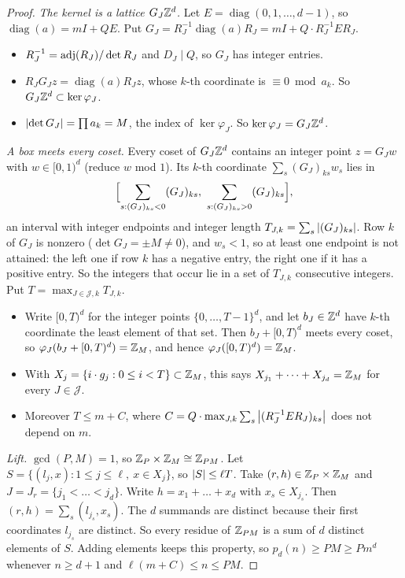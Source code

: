 \documentclass[11pt]{article}
\begin{document}
\begin{proof}
\emph{The kernel is a lattice $G_J \mathbb{Z}^d$.} Let $E = \operatorname{diag}(0, 1, \dots, d-1)$, so
$\operatorname{diag}(a) = mI + QE$. Put
$G_J = R_J^{-1} \operatorname{diag}(a) R_J = mI + Q \cdot R_J^{-1} E R_J$.
\begin{itemize}
  \item $R_J^{-1} = \operatorname{adj}(R_J)/\det R_J$ and $D_J \mid Q$, so $G_J$ has integer entries.
  \item $R_J G_J z = \operatorname{diag}(a) R_J z$, whose $k$-th coordinate is $\equiv 0 \bmod a_k$.
    So $G_J \mathbb{Z}^d \subset \ker \varphi_J$.
  \item $\left|\det G_J\right| = \prod a_k = M$, the index of $\ker \varphi_J$. So
    $\ker \varphi_J = G_J \mathbb{Z}^d$.
\end{itemize}

\emph{A box meets every coset.} Every coset of $G_J \mathbb{Z}^d$ contains an integer point $z = G_J w$
with $w \in [0,1)^d$ (reduce $w$ mod $1$). Its $k$-th coordinate $\sum_s (G_J)_{ks} w_s$ lies in
\[
  \Bigl[\sum_{s : (G_J)_{ks} < 0} (G_J)_{ks},\ \sum_{s : (G_J)_{ks} > 0} (G_J)_{ks}\Bigr],
\]
an interval with integer endpoints and integer length $T_{J,k} = \sum_s \left|(G_J)_{ks}\right|$. Row $k$
of $G_J$ is nonzero ($\det G_J = \pm M \ne 0$), and $w_s < 1$, so at least one endpoint is not
attained: the left one if row $k$ has a negative entry, the right one if it has a positive entry.
So the integers that occur lie in a set of $T_{J,k}$ consecutive integers. Put
$T = \max_{J \in \mathcal{J}, k} T_{J,k}$.
\begin{itemize}
  \item Write $[0, T)^d$ for the integer points $\{0, \dots, T-1\}^d$, and let $b_J \in \mathbb{Z}^d$ have
    $k$-th coordinate the least element of that set. Then $b_J + [0, T)^d$ meets every coset,
    so $\varphi_J(b_J + [0,T)^d) = \mathbb{Z}_M$, and hence $\varphi_J([0,T)^d) = \mathbb{Z}_M$.
  \item With $X_j = \{i \cdot g_j : 0 \le i < T\} \subset \mathbb{Z}_M$, this says
    $X_{j_1} + \dots + X_{j_d} = \mathbb{Z}_M$ for every $J \in \mathcal{J}$.
  \item Moreover $T \le m + C$, where
    $C = Q \cdot \max_{J,k} \sum_s \left|(R_J^{-1} E R_J)_{ks}\right|$ does not depend on $m$.
\end{itemize}

\emph{Lift.} $\gcd(P, M) = 1$, so $\mathbb{Z}_P \times \mathbb{Z}_M \cong \mathbb{Z}_{PM}$. Let
$S = \{(l_j, x) : 1 \le j \le \ell,\ x \in X_j\}$, so $\left|S\right| \le \ell T$. Take
$(r, h) \in \mathbb{Z}_P \times \mathbb{Z}_M$ and $J = J_r = \{j_1 < \dots < j_d\}$. Write
$h = x_1 + \dots + x_d$ with $x_s \in X_{j_s}$. Then $(r, h) = \sum_s (l_{j_s}, x_s)$. The $d$
summands are distinct because their first coordinates $l_{j_s}$ are distinct. So every residue of
$\mathbb{Z}_{PM}$ is a sum of $d$ distinct elements of $S$. Adding elements keeps this property, so
$p_d(n) \ge PM \ge P m^d$ whenever $n \ge d+1$ and $\ell(m + C) \le n \le PM$.


\end{proof}
\end{document}
